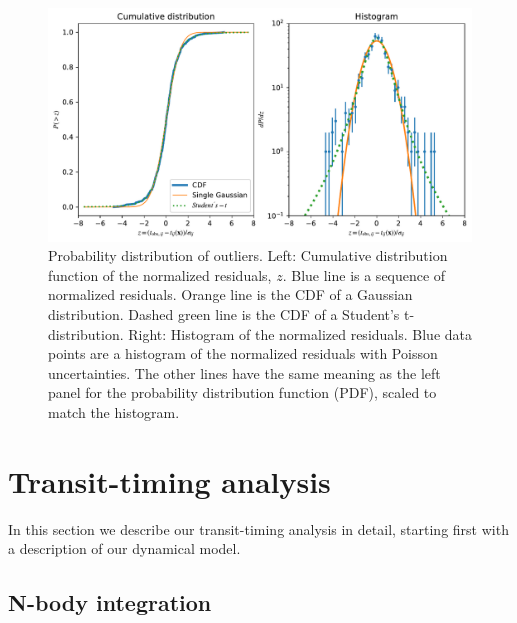 \documentclass[fleqn,usenatbib]{mnras} %
\begin{document}

\begin{figure}
    \centering
    \includegraphics[width=\hsize]{figures/Students_t_optimized.pdf}
    \caption{Probability distribution of outliers.  Left:  Cumulative distribution 
    function of the normalized residuals, $z$.  Blue line is a sequence of normalized residuals. 
    Orange line is the CDF of a Gaussian distribution. %
    Dashed green line is the CDF of a Student's t- 
    distribution.  Right: Histogram of the normalized residuals.  Blue data points 
    are a histogram of the normalized residuals with Poisson uncertainties.  The other lines 
    have the same meaning as the left panel for the probability distribution function 
    (PDF),  scaled to match the histogram.}
    \label{fig:timing_residuals}
\end{figure}

\section{Transit-timing analysis} \label{sec:transit_timing}

In this section we describe our transit-timing analysis in detail, starting first with a description of our dynamical model.




\subsection{N-body integration}
\end{document}

